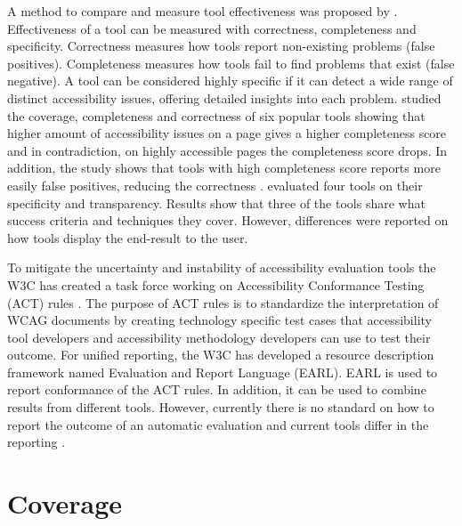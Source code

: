 A method to compare and measure tool effectiveness was proposed by \textcite{Brajnik2004}. Effectiveness of a tool can be measured with correctness, completeness and specificity. Correctness measures how tools report non-existing problems (false positives). Completeness measures how tools fail to find problems that exist (false negative). A tool can be considered highly specific if it can detect a wide range of distinct accessibility issues, offering detailed insights into each problem. \textcite{benchmark_aet} studied the coverage, completeness and correctness of six popular tools showing that higher amount of accessibility issues on a page gives a higher completeness score and in contradiction, on highly accessible pages the completeness score drops. In addition, the study shows that tools with high completeness score reports more easily false positives, reducing the correctness \citep{benchmark_aet}. \textcite{tooltransparency} evaluated four tools on their specificity and transparency. Results show that three of the tools share what success criteria and techniques they cover. However, differences were reported on how tools display the end-result to the user.

To mitigate the uncertainty and instability of accessibility evaluation tools the W3C has created a task force working on Accessibility Conformance Testing (ACT) rules \citep{act_overview}. The purpose of ACT rules is to standardize the interpretation of WCAG documents by creating technology specific test cases that accessibility tool developers and accessibility methodology developers can use to test their outcome. For unified reporting, the W3C has developed a resource description framework named Evaluation and Report Language (EARL). EARL is used to report conformance of the ACT rules. In addition, it can be used to combine results from different tools. However, currently there is no standard on how to report the outcome of an automatic evaluation and current tools differ in the reporting \citep{tool_analysis_directive}.

\section{Coverage\label{coverage}}

